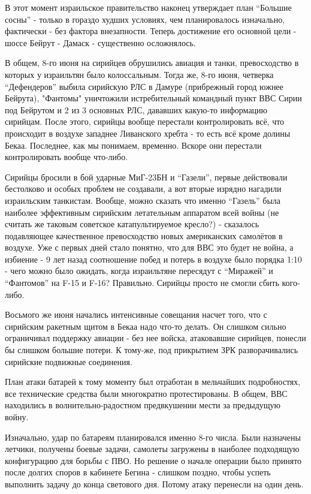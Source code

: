 В этот момент израильское правительство наконец утверждает план “Большие сосны” - только в гораздо худших условиях, чем планировалось изначально, фактически - без фактора внезапности. Теперь достижение его основной цели - шоссе Бейрут - Дамаск - существенно осложнялось.

В общем, 8-го июня на сирийцев обрушились авиация и танки, превосходство в которых у израильтян было колоссальным. Тогда же, 8-го июня, четверка “Дефендеров” выбила сирийскую РЛС в Дамуре (прибрежный город южнее Бейрута), "Фантомы" уничтожили истребительный командный пункт ВВС Сирии под Бейрутом и 2 из 3 основных РЛС, дававших какую-то информацию сирийцам. После этого, сирийцы вообще перестали контролировать всё, что происходит в воздухе западнее Ливанского хребта - то есть всё кроме долины Бекаа. Последнее, как мы понимаем, временно. Вскоре они перестали контролировать вообще что-либо.

Сирийцы бросили в бой ударные МиГ-23БН и “Газели”, первые действовали бестолково и особых проблем не создавали, а вот вторые изрядно нагадили израильским танкистам. Вообще, можно сказать что именно “Газель” была наиболее эффективным сирийским летательным аппаратом всей войны (не считать же таковым советское катапультируемое кресло?) - сказалось подавляющее качественное превосходство новых американских самолётов в воздухе. Уже с первых дней стало понятно, что для ВВС это будет не война, а избиение - 9 лет назад соотношение побед и потерь в воздухе было порядка 1:10 - чего можно было ожидать, когда израильтяне пересядут с “Миражей” и “Фантомов” на F-15 и F-16? Правильно. Сирийцы просто не смогли сбить кого-либо.

Восьмого же июня начались интенсивные совещания насчет того, что с сирийским ракетным щитом в Бекаа надо что-то делать. Он слишком сильно ограничивал поддержку авиации - без нее войска, атаковавшие сирийцев, понесли бы слишком большие потери. К тому-же, под прикрытием ЗРК разворачивались сирийские подвижные соединения.

План атаки батарей к тому моменту был отработан в мельчайших подробностях, все технические средства были многократно протестированы. В общем, ВВС находились в волнительно-радостном предвкушении мести за предыдущую войну.

Изначально, удар по батареям планировался именно 8-го числа. Были назначены летчики, получены боевые задачи, самолеты загружены в наиболее подходящую конфигурацию для борьбы с ПВО. Но решение о начале операции было принято после долгих споров в кабинете Бегина - слишком поздно, чтобы успеть выполнить задачу до конца светового дня. Потому атаку перенесли на один день.

